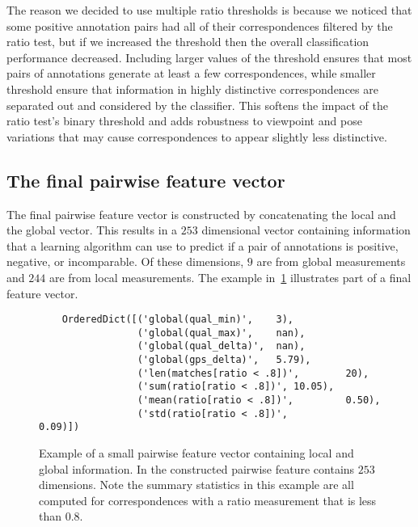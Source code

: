 
The reason we decided to use multiple ratio thresholds is because we noticed that some positive annotation pairs
  had all of their correspondences filtered by the ratio test, but if we increased the threshold then the overall
  classification performance decreased.
Including larger values of the threshold ensures that most pairs of annotations generate at least a few
  correspondences, while smaller threshold ensure that information in highly distinctive correspondences are
  separated out and considered by the classifier.
This softens the impact of the ratio test's binary threshold and adds robustness to viewpoint and pose variations
  that may cause correspondences to appear slightly less distinctive.

\FloatBarrier{}
\subsection{The final pairwise feature vector}

The final pairwise feature vector is constructed by concatenating the local and the global vector.
This results in a $253$ dimensional vector containing information that a learning algorithm can use to predict if
  a pair of annotations is positive, negative, or incomparable.
Of these dimensions, $9$ are from global measurements and $244$ are from local measurements.
The example in~\cref{fig:PairFeatVec} illustrates part of a final feature vector.

\begin{figure}
\begin{verbatim}
    OrderedDict([('global(qual_min)',    3),
                 ('global(qual_max)',    nan),
                 ('global(qual_delta)',  nan),
                 ('global(gps_delta)',   5.79),
                 ('len(matches[ratio < .8])',        20),
                 ('sum(ratio[ratio < .8])', 10.05),
                 ('mean(ratio[ratio < .8])',         0.50),
                 ('std(ratio[ratio < .8])',          0.09)])
\end{verbatim}
\caption[A pairwise feature vector]{ %
Example of a small pairwise feature vector containing local and global information.
In the constructed pairwise feature contains $253$ dimensions.
Note the summary statistics in this example are all computed for correspondences with a ratio measurement that is
  less than $0.8$.
}
\label{fig:PairFeatVec}
\end{figure}


